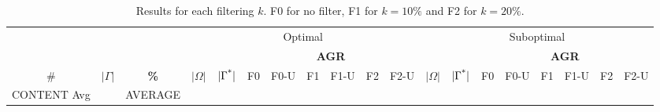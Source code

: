 \documentclass[letterpaper]{article}
\begin{document}
\begin{table*}[]
\centering
\fontsize{4}{6}\selectfont
\setlength\tabcolsep{1.5pt}
\begin{tabular}{ccccccccccccccccccc}
\toprule
 & & & \multicolumn{8}{c}{Optimal} & \multicolumn{8}{c}{Suboptimal}\\
\cmidrule(lr){4-11}\cmidrule(lr){12-19}
 & & & & & \multicolumn{6}{c}{\textbf{AGR}} & & & \multicolumn{6}{c}{\textbf{AGR}}\\
\cline{6-11} \cline{14-19}
\# & $|\Gamma|$ & \textbf{\%} & $|\Omega|$ & $|\Gamma^\textup{*}|$ & F0 & F0-U & F1 & F1-U & F2 & F2-U & $|\Omega|$ & $|\Gamma^\textup{*}|$ & F0 & F0-U & F1 & F1-U & F2 & F2-U\\
\midrule
CONTENT
Avg & & AVERAGE\\
\bottomrule
\end{tabular}\\
\caption{Results for each filtering $k$. F0 for no filter, F1 for $k=10\%$ and F2 for $k=20\%$.}
\end{table*}
\end{document}
